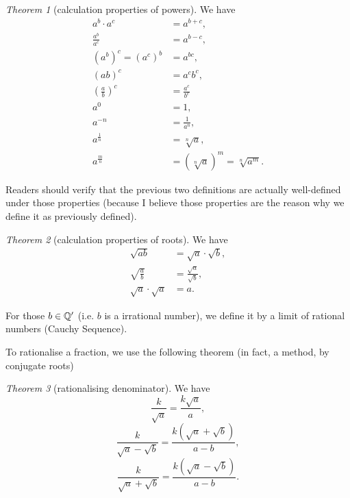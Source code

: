 \documentclass[8pt]{article}
\theoremstyle{remark}
\newtheorem{theorem}{Theorem}[section]
\begin{document}
        \begin{theorem}[calculation properties of powers]
            We have
            \begin{align*}
                a^b \cdot a^c &= a^{b + c},\\
                \frac{a^b}{a^c} &= a^{b - c},\\
                (a^b)^c = (a^c)^b &= a^{bc},\\
                (ab)^c &= a^c b^c,\\
                \left(\frac{a}{b}\right)^c &= \frac{a^c}{b^c}\\
                a^0 &= 1,\\
                a^{-n} &= \frac{1}{a^n},\\
                a^{\frac{1}{n}} &= \sqrt[n]{a},\\
                a^{\frac{m}{n}} &= \left(\sqrt[n]{a}\right)^m = \sqrt[n]{a^m}.
            \end{align*}

            Readers should verify that the previous two definitions are actually well-defined under those properties (because I believe those properties are the reason why we define it as previously defined).
        \end{theorem}

        \begin{theorem}[calculation properties of roots]
            We have
            \begin{align*}
                \sqrt{ab} &= \sqrt{a} \cdot \sqrt{b},\\
                \sqrt{\frac{a}{b}} &= \frac{\sqrt{a}}{\sqrt{b}},\\
                \sqrt{a} \cdot \sqrt{a} &= a.
            \end{align*}
        \end{theorem}

        For those $b \in \mathbb{Q}'$ (i.e. $b$ is a irrational number), we define it by a limit of rational numbers (Cauchy Sequence).

        To rationalise a fraction, we use the following theorem (in fact, a method, by conjugate roots)
        
        \begin{theorem}[rationalising denominator]
            We have
            $$
                \frac{k}{\sqrt{a}} = \frac{k \sqrt{a}}{a},
            $$
            $$
                \frac{k}{\sqrt{a} - \sqrt{b}} = \frac{k(\sqrt{a} + \sqrt{b})}{a - b},
            $$
            $$
                \frac{k}{\sqrt{a} + \sqrt{b}} = \frac{k(\sqrt{a} - \sqrt{b})}{a - b}.
            $$
        \end{theorem}
\end{document}
